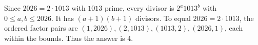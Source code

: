 Since $2026=2\cdot 1013$ with $1013$ prime, every divisor is $2^a1013^b$ with $0\le a,b\le 2026$. It has $(a+1)(b+1)$ divisors. To equal $2026=2\cdot 1013$, the ordered factor pairs are $(1,2026),(2,1013),(1013,2),(2026,1)$, each within the bounds. Thus the answer is $\boxed 4$.
